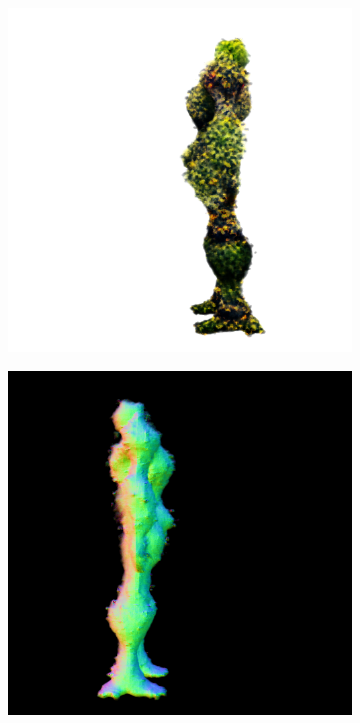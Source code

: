 \begin{figure}[ht]
\begin{subfigure}[b]{0.222\textwidth}
        \includegraphics[width=\textwidth]{etc/a robot made out of plants/magic123/magic123_coarse_robot_left_5000_part1.png}
        \caption{}
    \end{subfigure}
    \begin{subfigure}[b]{0.222\textwidth}
        \centering
        \fontsize{9pt}{7pt}\selectfont{}\vspace{.1cm}
        \includegraphics[width=\textwidth]{etc/a robot made out of plants/magic123/magic123_coarse_robot_right_10000_part2.png}

\end{subfigure}
\end{figure}
